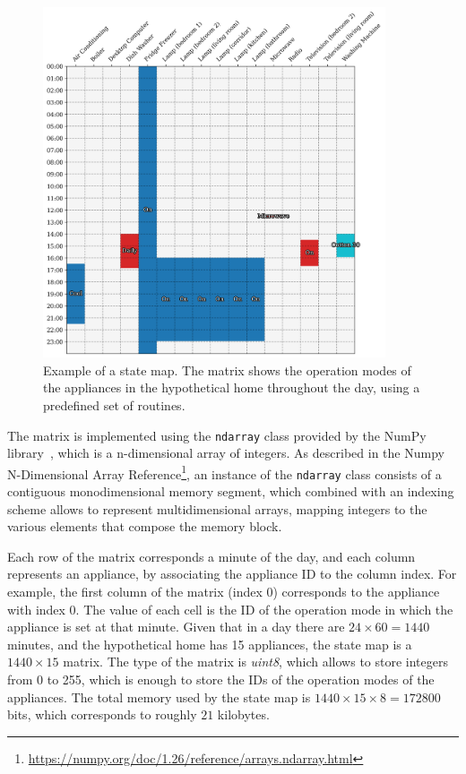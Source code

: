 \begin{figure}
    \centering
    \includegraphics[width=0.9\textwidth]{images/real_matrix.png}
    \caption[Example of a state map.]{Example of a state map. The matrix shows the operation modes of the appliances in the hypothetical home throughout the day, using a predefined set of routines.}
    \label{fig:state_map}
\end{figure}

The matrix is implemented using the \texttt{ndarray} class provided by the NumPy library~\parencite{harrisArrayProgrammingNumPy2020}, which is a n-dimensional array of integers. As described in the Numpy N-Dimensional Array Reference\footnote{\url{https://numpy.org/doc/1.26/reference/arrays.ndarray.html}}, an instance of the \texttt{ndarray} class consists of a contiguous monodimensional memory segment, which combined with an indexing scheme allows to represent multidimensional arrays, mapping integers to the various elements that compose the memory block.

Each row of the matrix corresponds a minute of the day, and each column represents an appliance, by associating the appliance ID to the column index. For example, the first column of the matrix (index $0$) corresponds to the appliance with index 0. The value of each cell is the ID of the operation mode in which the appliance is set at that minute. Given that in a day there are $24 \times 60 = 1440$ minutes, and the hypothetical home has 15 appliances, the state map is a $1440 \times 15$ matrix. The type of the matrix is \textit{uint8}, which allows to store integers from 0 to 255, which is enough to store the IDs of the operation modes of the appliances. The total memory used by the state map is $1440 \times 15 \times 8 = 172800$ bits, which corresponds to roughly $21$ kilobytes.

